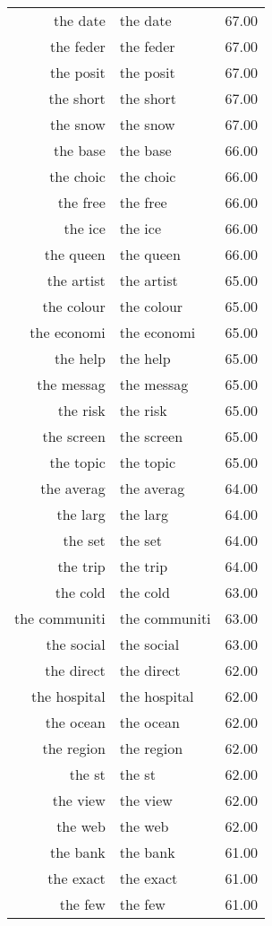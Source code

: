 \begin{table}[ht]
\begin{tabular}{rlr}
  the date & the date & 67.00 \\ 
  the feder & the feder & 67.00 \\ 
  the posit & the posit & 67.00 \\ 
  the short & the short & 67.00 \\ 
  the snow & the snow & 67.00 \\ 
  the base & the base & 66.00 \\ 
  the choic & the choic & 66.00 \\ 
  the free & the free & 66.00 \\ 
  the ice & the ice & 66.00 \\ 
  the queen & the queen & 66.00 \\ 
  the artist & the artist & 65.00 \\ 
  the colour & the colour & 65.00 \\ 
  the economi & the economi & 65.00 \\ 
  the help & the help & 65.00 \\ 
  the messag & the messag & 65.00 \\ 
  the risk & the risk & 65.00 \\ 
  the screen & the screen & 65.00 \\ 
  the topic & the topic & 65.00 \\ 
  the averag & the averag & 64.00 \\ 
  the larg & the larg & 64.00 \\ 
  the set & the set & 64.00 \\ 
  the trip & the trip & 64.00 \\ 
  the cold & the cold & 63.00 \\ 
  the communiti & the communiti & 63.00 \\ 
  the social & the social & 63.00 \\ 
  the direct & the direct & 62.00 \\ 
  the hospital & the hospital & 62.00 \\ 
  the ocean & the ocean & 62.00 \\ 
  the region & the region & 62.00 \\ 
  the st & the st & 62.00 \\ 
  the view & the view & 62.00 \\ 
  the web & the web & 62.00 \\ 
  the bank & the bank & 61.00 \\ 
  the exact & the exact & 61.00 \\ 
  the few & the few & 61.00 \\ 

\end{tabular}
\end{table}
